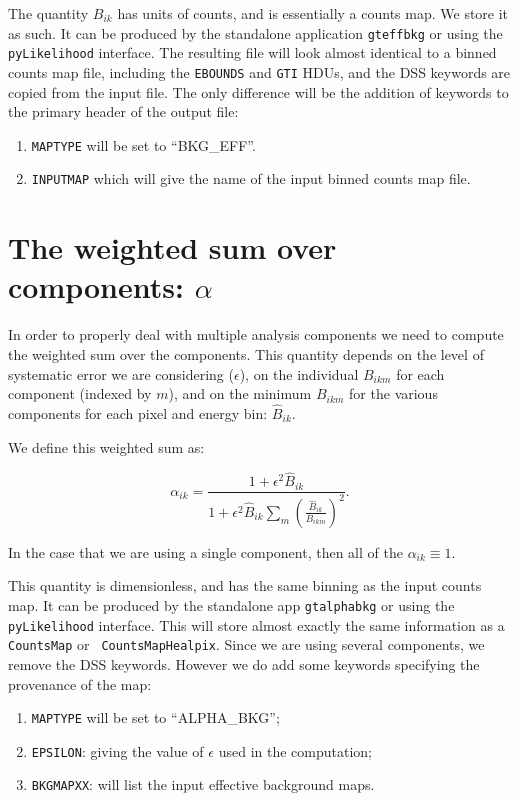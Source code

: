 \documentclass[preprint]{aastex}
\begin{document}
The quantity $B_{ik}$ has units of counts, and is essentially a counts
map.  We store it as such.  It can be produced by the standalone
application {\tt gteffbkg} or using the {\tt pyLikelihood} interface.
The resulting file will look almost identical to a binned counts map
file, including the {\tt EBOUNDS} and {\tt GTI} HDUs, and the DSS
keywords are copied from the input file.  The only difference will be
the addition of keywords to the primary header of the output file:

\begin{enumerate}
\item{{\tt MAPTYPE} will be set to ``BKG\_EFF''.}
\item{{\tt INPUTMAP} which will give the name of the input binned counts map
file.}
\end{enumerate}

\section{The weighted sum over components: \texorpdfstring{$\alpha$}{alpha}}

In order to properly deal with multiple analysis components we need to
compute the weighted sum over the components.  This quantity depends on
the level of systematic error we are considering ($\epsilon$), on the
individual $B_{ikm}$ for each component (indexed by $m$), and on the
minimum $B_{ikm}$ for the various components for each pixel and energy
bin: $\hat{B}_{ik}$.

We define this weighted sum as:

\begin{equation}
\alpha_{ik} = \frac{1 + \epsilon^2 \hat{B}_{ik}}{1 + \epsilon^2 \hat{B}_{ik} \sum_{m} (\frac{\hat{B}_{ik}}{B_{ikm}})^2 }.
\end{equation}

\noindent In the case that we are using a single component, then all
of the $\alpha_{ik} \equiv 1$.

This quantity is dimensionless, and has the same binning as the input
counts map.  It can be produced by the standalone app {\tt gtalphabkg}
or using the {\tt pyLikelihood} interface.  This will store almost
exactly the same information as a {\tt CountsMap} or {\tt
  CountsMapHealpix}. Since we are using several components, we remove 
the DSS keywords.  However we do add some keywords specifying the
provenance of the map:

\begin{enumerate}
\item{{\tt MAPTYPE} will be set to ``ALPHA\_BKG'';}
\item{{\tt EPSILON}: giving the value of $\epsilon$ used in the computation;}
\item{{\tt BKGMAPXX}: will list the input effective background maps.}    
\end{enumerate}
\end{document}
